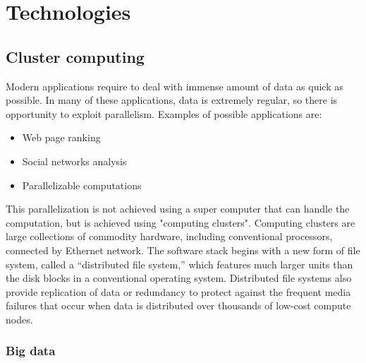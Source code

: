 \documentclass[\main/main.tex]{subfiles}
\begin{document}
\chapter{Technologies}
\section{Cluster computing}
Modern applications require to deal with immense amount of data as quick as possible. In many of these applications, data is extremely regular, so there is opportunity to exploit parallelism. Examples of possible applications are:
\begin{itemize}
    \item Web page ranking
    \item Social networks analysis
    \item Parallelizable computations
\end{itemize}
This parallelization is not achieved using a super computer that can handle the computation, but is achieved using "computing clusters". Computing clusters are large collections of commodity hardware, including conventional processors, connected by Ethernet network. The software stack begins with a new form of file system, called a “distributed file system,” which features much larger units than the disk blocks in a conventional operating system. Distributed file systems also provide replication of data or redundancy to protect against the frequent media failures that occur when data is distributed over thousands of low-cost compute nodes. \cite{leskovec_rajaraman_ullman_2020}

\subsection{Big data}
\end{document}
